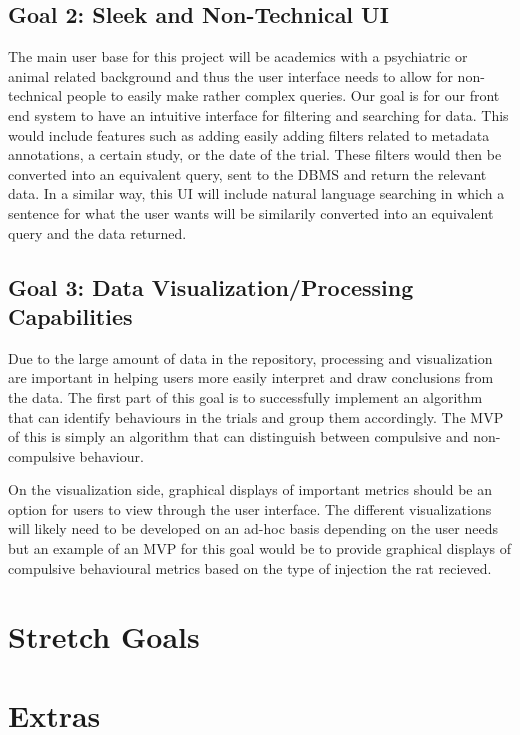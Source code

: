\documentclass{article}
\begin{document}
  \subsection{Goal 2: Sleek and Non-Technical UI}
  
  \par{The main user base for this project will be academics with a psychiatric or
  animal related background and thus the user interface needs to allow for non-technical
  people to easily make rather complex queries. Our goal is for our front end system to have an intuitive
  interface for filtering and searching for data. This would include features such as adding easily adding filters related to metadata annotations, a certain study,
  or the date of the trial. These filters would then be converted into an equivalent query, sent to the DBMS and return the relevant data. In a similar way,
  this UI will include natural language searching in which a sentence for what the user wants will be similarily converted into an equivalent query and the data returned.}

 \subsection{Goal 3: Data Visualization/Processing Capabilities} 
 
 \par{Due to the large amount of data in the repository, processing and visualization are important in
  helping users more easily interpret and draw conclusions from the data. The first part of this goal is to successfully implement an algorithm that
  can identify behaviours in the trials and group them accordingly. The MVP of this is simply an algorithm that can distinguish between compulsive and non-compulsive
  behaviour.
  
  On the visualization side, graphical displays of important metrics should be an option for users to view through the user interface. The different
  visualizations will likely need to be developed on an ad-hoc basis depending on the user needs but an example of an MVP for this goal would be to provide graphical
  displays of compulsive behavioural metrics based on the type of injection the rat recieved.}


\section{Stretch Goals}

\section{Extras}
\end{document}
